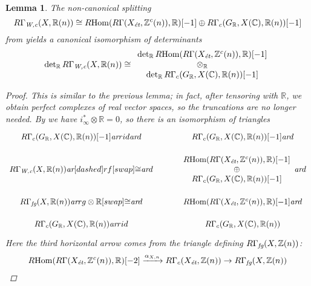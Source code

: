 \documentclass[10pt,a4paper,oneside]{article}
\DeclareMathOperator{\Hom}{Hom}
\newcommand{\CC}{\mathbb{C}}
\newcommand{\RR}{\mathbb{R}}
\newcommand{\ZZ}{\mathbb{Z}}
\renewcommand{\det}{\operatorname{det}}
\newcommand{\ar}{\text{\it ar}}
\newcommand{\et}{\text{\it \'{e}t}}
\newcommand{\fg}{\text{\it fg}}
\newcommand{\Wc}{\text{\it W,c}}
\newcommand{\RHom}{R\!\Hom}
\theoremstyle{myplain}
\newtheorem{lemma}[theorem]{Lemma}
\theoremstyle{mydefinition}
\numberwithin{equation}{section}
\begin{document}
\begin{lemma}
  The non-canonical splitting
  \[ R\Gamma_\Wc (X, \RR(n)) \cong
    \RHom (R\Gamma (X_\et, \ZZ^c (n)), \RR) [-1] \oplus
    R\Gamma_c (G_\RR, X (\CC), \RR (n)) [-1] \]
  from \cite[Proposition~7.13]{Beshenov-Weil-etale-1} yields a canonical
  isomorphism of determinants
  \[ \det_\RR R\Gamma_\Wc (X, \RR (n)) \cong
    \begin{array}{c}
      \det_\RR \RHom (R\Gamma (X_\et, \ZZ^c (n)), \RR) [-1] \\
      \otimes_\RR \\
      \det_\RR R\Gamma_c (G_\RR, X (\CC), \RR (n)) [-1]
    \end{array} \]

  \begin{proof}
    This is similar to the previous lemma; in fact, after tensoring with $\RR$,
    we obtain perfect complexes of real vector spaces, so the truncations are no
    longer needed. By \cite[Proposition~7.4]{Beshenov-Weil-etale-1} we have
    $i_\infty^* \otimes \RR = 0$, so there is an isomorphism of triangles
    \begin{equation}
      \label{eqn:splitting-of-RGamma-Wc-triangles}
      \begin{tikzcd}[row sep=1em]
        R\Gamma_c (G_\RR, X (\CC), \RR (n)) [-1] \ar{r}{id}\ar{d} & R\Gamma_c (G_\RR, X (\CC), \RR (n)) [-1]\ar{d} \\
        R\Gamma_\Wc (X, \RR (n)) \ar[dashed]{r}{f}[swap]{\cong}\ar{d} & \begin{array}{c} \RHom (R\Gamma (X_\et, \ZZ^c (n)), \RR) [-1] \\ \oplus \\ R\Gamma_c (G_\RR, X (\CC), \RR (n)) [-1] \end{array}\ar{d} \\
        R\Gamma_\fg (X, \RR (n)) \ar{r}{g\otimes \RR}[swap]{\cong}\ar{d} & \RHom (R\Gamma (X_\et, \ZZ^c (n)), \RR) [-1] \ar{d} \\
        R\Gamma_c (G_\RR, X (\CC), \RR (n)) \ar{r}{id} & R\Gamma_c (G_\RR, X (\CC), \RR (n))
      \end{tikzcd}
    \end{equation}
    Here the third horizontal arrow comes from the triangle defining
    $R\Gamma_\fg (X, \ZZ(n))$:
    \begin{multline*}
      \RHom (R\Gamma (X_\et, \ZZ^c (n)), \RR) [-2] \xrightarrow{\alpha_{X,n}}
      R\Gamma_c (X_\et, \ZZ (n)) \to
      R\Gamma_\fg (X, \ZZ(n)) \\

\end{multline*}
\end{proof}
\end{lemma}
\end{document}
